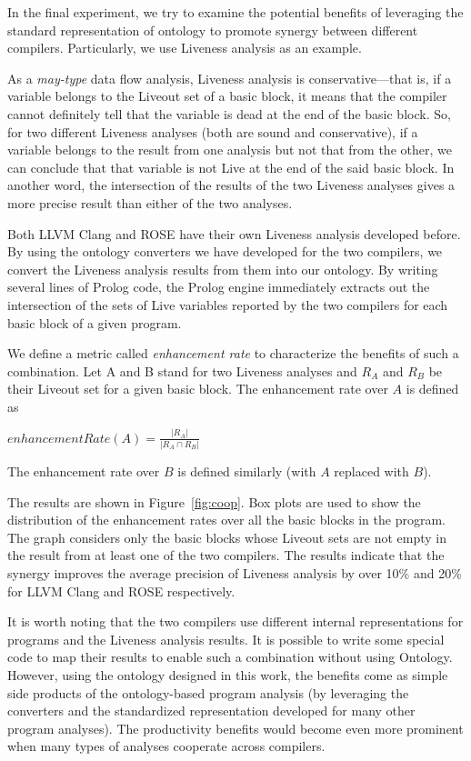 In the final experiment, we try to examine the potential benefits of
leveraging the standard representation of ontology to promote synergy
between different compilers. Particularly, we use Liveness analysis as
an example. 

As a {\em may-type} data flow analysis, Liveness analysis is
conservative---that is, if a variable belongs to the Liveout set of a
basic block, it means that the compiler cannot definitely tell that
the variable is dead at the end of the basic block. So, for two
different Liveness analyses (both are sound and conservative), if a
variable belongs to the result from one analysis but not that from the
other, we can conclude that that variable is not Live at the end of
the said basic block. In another word, the intersection of the results
of the two Liveness analyses gives a more precise result than either
of the two analyses. 

Both LLVM Clang and ROSE have their own Liveness analysis developed
before. By using the ontology converters we have developed for the two
compilers, we convert the Liveness analysis results from them into our
ontology. By writing several lines of Prolog code, the Prolog engine
immediately extracts out the intersection of the sets of Live
variables reported by the two compilers for each basic block of a
given program.

We define a metric called {\em enhancement rate} to characterize the
benefits of such a combination. Let A and B stand for two Liveness
analyses and $R_A$ and $R_B$ be their Liveout set for a given basic
block. The enhancement rate over $A$ is defined as

$enhancementRate(A) = \frac{|R_A|}{|R_A \cap R_B|}$

The enhancement rate over $B$ is defined similarly (with $A$ replaced with
$B$).

The results are shown in Figure~\ref{fig:coop}. Box plots are used to
show the distribution of the enhancement rates over all the basic
blocks in the program. The graph considers only the basic blocks whose
Liveout sets are not empty in the result from at least one of the two
compilers.  The results indicate that the synergy improves the average
precision of Liveness analysis by over 10\% and 20\% for LLVM Clang and ROSE
respectively.

It is worth noting that the two compilers use different internal
representations for programs and the Liveness analysis results. It is
possible to write some special code to map their results to enable
such a combination without using Ontology. However, using the ontology
designed in this work, the benefits come as simple side products of
the ontology-based program analysis (by leveraging the converters and
the standardized representation developed for many other program
analyses). The productivity benefits would become even more prominent
when many types of analyses cooperate across compilers.
